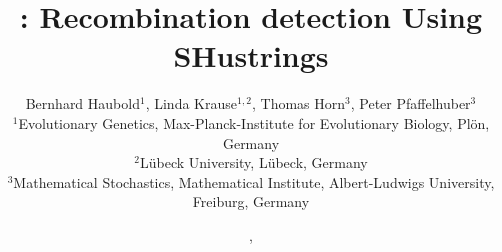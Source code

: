 \documentclass{article}
\begin{document}
\pagestyle{noweb}

\title{: Recombination detection Using SHustrings}
\author{Bernhard Haubold$^1$, Linda Krause$^{1,2}$, Thomas Horn$^3$, Peter
  Pfaffelhuber$^3$\\
\small $^1$Evolutionary Genetics, Max-Planck-Institute for Evolutionary Biology, Pl\"on,
Germany\\
\small $^2$L\"ubeck University, L\"ubeck, Germany\\
\small $^3$Mathematical Stochastics, Mathematical Institute,
Albert-Ludwigs University, Freiburg, Germany}
\date{\!\!, }
\maketitle




\end{document}

